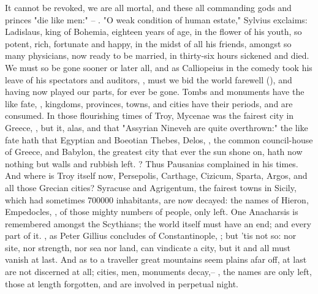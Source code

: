 {It cannot be revoked, we are all mortal, and these all commanding gods and princes "die like men:" -- . "O weak condition of human estate," Sylvius exclaims: Ladislaus, king of Bohemia, eighteen years of age, in the flower of his youth, so potent, rich, fortunate and happy, in the midst of all his friends, amongst so many physicians, now ready to be married, in thirty-six hours sickened and died. We must so be gone sooner or later all, and as Calliopeius in the comedy took his leave of his spectators and auditors, , must we bid the world farewell (), and having now played our parts, for ever be gone. Tombs and monuments have the like fate, , kingdoms, provinces, towns, and cities have their periods, and are consumed. In those flourishing times of Troy, Mycenae was the fairest city in Greece, , but it, alas, and that "Assyrian Nineveh are quite overthrown:" the like fate hath that Egyptian and Boeotian Thebes, Delos, , the common council-house of Greece, and Babylon, the greatest city that ever the sun shone on, hath now nothing but walls and rubbish left. ? Thus Pausanias complained in his times. And where is Troy itself now, Persepolis, Carthage, Cizicum, Sparta, Argos, and all those Grecian cities? Syracuse and Agrigentum, the fairest towns in Sicily, which had sometimes 700\thinspace{}000 inhabitants, are now decayed: the names of Hieron, Empedocles, \etc{}, of those mighty numbers of people, only left. One Anacharsis is remembered amongst the Scythians; the world itself must have an end; and every part of it. , as Peter Gillius concludes of Constantinople, ; but 'tis not so: nor site, nor strength, nor sea nor land, can vindicate a city, but it and all must vanish at last. And as to a traveller great mountains seem plains afar off, at last are not discerned at all; cities, men, monuments decay,-- , the names are only left, those at length forgotten, and are involved in perpetual night.

}
